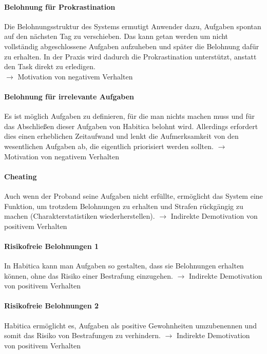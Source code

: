 \documentclass[sigconf, nonacm]{acmart}
\begin{document}
\paragraph{Belohnung für Prokrastination}\label{sec:cpe3}
Die Belohnungsstruktur des Systems ermutigt Anwender dazu, Aufgaben spontan auf den nächsten Tag zu verschieben. Das kann getan werden um nicht vollständig abgeschlossene Aufgaben aufzuheben und später die Belohnung dafür zu erhalten. In der Praxis wird dadurch die Prokrastination unterstützt, anstatt den Task direkt zu erledigen.\\
$\rightarrow$ Motivation von negativem Verhalten

\paragraph{Belohnung für irrelevante Aufgaben}\label{sec:cpe4}
Es ist möglich Aufgaben zu definieren, für die man nichts machen muss und für das Abschließen dieser Aufgaben von Habitica belohnt wird. Allerdings erfordert dies einen erheblichen Zeitaufwand und lenkt die Aufmerksamkeit von den wesentlichen Aufgaben ab, die eigentlich priorisiert werden sollten.
$\rightarrow$ Motivation von negativem Verhalten

\paragraph{Cheating}\label{sec:cpe5}
Auch wenn der Proband seine Aufgaben nicht erfüllte, ermöglicht das System eine Funktion, um trotzdem Belohnungen zu erhalten und Strafen rückgängig zu machen (Charakterstatistiken wiederherstellen).
$\rightarrow$ Indirekte Demotivation von positivem Verhalten

\paragraph{Risikofreie Belohnungen 1}\label{sec:cpe6}
In Habitica kann man Aufgaben so gestalten, dass sie Belohnungen erhalten können, ohne das Risiko einer Bestrafung einzugehen.
$\rightarrow$ Indirekte Demotivation von positivem Verhalten

\paragraph{Risikofreie Belohnungen 2}\label{sec:cpe7}
Habitica ermöglicht es, Aufgaben als positive Gewohnheiten umzubenennen und somit das Risiko von Bestrafungen zu verhindern.
$\rightarrow$ Indirekte Demotivation von positivem Verhalten 
\\
\\
\end{document}
